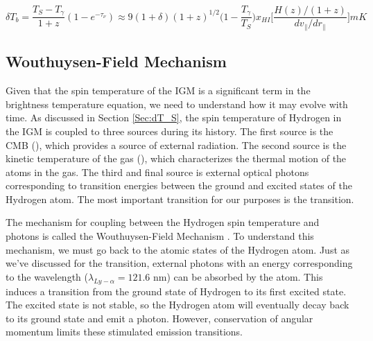\begin{equation}\label{Eq:dT_b}
\delta T_b = \frac{T_S - T_\gamma}{1+z}(1-e^{-\tau_\nu}) \approx 9 (1+\delta) (1+z)^{1/2} \Big(1-\frac{T_\gamma}{T_S}\Big) x_{HI} \Big[ \frac{H(z)/(1+z)}{dv_{\parallel}/dr_{\parallel}} \Big] mK
\end{equation}


\subsection{Wouthuysen-Field Mechanism}\label{Sec:WFM}

Given that the spin temperature of the IGM is a significant term in the brightness temperature equation, we need to understand how it may evolve with time. As discussed in Section \ref{Sec:dT_S}, the spin temperature of Hydrogen in the IGM is coupled to three sources during its history. The first source is the CMB (\tg), which provides a source of external \cm radiation. The second source is the kinetic temperature of the gas (\tk), which characterizes the thermal motion of the atoms in the gas. The third and final source is external optical photons corresponding to transition energies between the ground and excited states of the Hydrogen atom. The most important transition for our purposes is the \lya transition. 

The mechanism for coupling between the Hydrogen spin temperature and \lya  photons is called the Wouthuysen-Field Mechanism \cite{wouthuysen_1952}\cite{field_1958}. To understand this mechanism, we must go back to the atomic states of the Hydrogen atom. Just as we've discussed for the \cm transition, external photons with an energy corresponding to the \lya  wavelength ($\lambda_{Ly-\alpha} = 121.6$ nm) can be absorbed by the atom. This induces a transition from the ground state of Hydrogen to its first excited state. The excited state is not stable, so the Hydrogen atom will eventually decay back to its ground state and emit a photon. However, conservation of angular momentum limits these stimulated emission transitions. 

